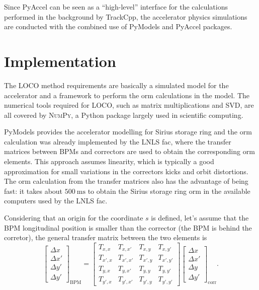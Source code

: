 Since PyAccel can be seen as a ``high-level'' interface for the calculations performed in the background by TrackCpp, the accelerator physics simulations are conducted with the combined use of PyModels and PyAccel packages.
\section{Implementation}
The LOCO method requirements are basically a simulated model for the accelerator and a framework to perform the \gls{orm} calculations in the model. The numerical tools required for LOCO, such as matrix multiplications and SVD, are all covered by \textsc{NumPy}, a Python package largely used in scientific computing. 

PyModels provides the accelerator modelling for Sirius storage ring and the \gls{orm} calculation was already implemented by the LNLS \gls{fac}, where the transfer matrices between BPMs and correctors are used to obtain the corresponding \gls{orm} elements. This approach assumes linearity, which is typically a good approximation for small variations in the correctors kicks and orbit distortions. The \gls{orm} calculation from the transfer matrices also has the advantage of being fast: it takes about $\SI{500}{\milli\second}$ to obtain the Sirius storage ring \gls{orm} in the available computers used by the LNLS \gls{fac}.

Considering that an origin for the coordinate $s$ is defined, let's assume that the BPM longitudinal position is smaller than the corrector (the BPM is behind the corretor), the general transfer matrix between the two elements is
\begin{equation}
    \begin{bmatrix}
    \Delta x \\
    \Delta x' \\
    \Delta y' \\
    \Delta y'
    \end{bmatrix}_{\mathrm{BPM}}  =
    \begin{bmatrix}
    T_{x, x} & T_{x, x'} & T_{x, y} & T_{x, y'} \\
    T_{x', x} & T_{x', x'} & T_{x', y} & T_{x', y'} \\
    T_{y, x} & T_{y, x'} & T_{y, y} & T_{y, y'} \\
    T_{y', x} & T_{y', x'} & T_{y', y} & T_{y', y'} 
    \end{bmatrix} 
    \begin{bmatrix}
    \Delta x \\
    \Delta x' \\
    \Delta y \\
    \Delta y'
    \end{bmatrix}_{\mathrm{corr}}.
\end{equation}

